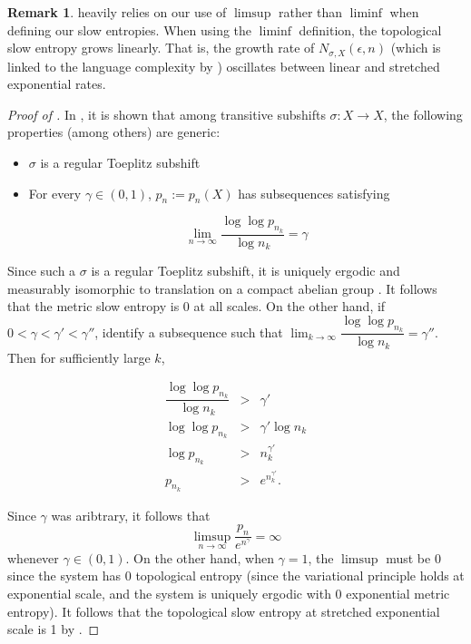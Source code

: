 \documentclass[oneside]{amsart}
\theoremstyle{plain}
\theoremstyle{definition}
\newtheorem{RMK}[THM]{Remark}
\newcommand{\<}{\langle}
\renewcommand{\>}{\rangle}
\newcommand{\ve}{\epsilon}
\renewcommand{\|}{|\!|} %
\begin{document}
\begin{RMK}
     heavily relies on our use of $\limsup$ rather than $\liminf$ when defining our slow entropies. When using the $\liminf$ definition, the topological slow entropy grows linearly. That is, the growth rate of $N_{\sigma,X}(\ve,n)$ (which is linked to the language complexity by ) oscillates between linear and stretched exponential rates.
\end{RMK}

\begin{proof}[Proof of ]
    In \cite[Theorem 5.15, Proposition 5.23]{PavlovSchmieding}, it is shown that among transitive subshifts $\sigma : X \to X$, the following properties (among others) are generic:

    \begin{itemize}
        \item $\sigma$ is a regular Toeplitz subshift
        \item For every $\gamma \in (0,1)$, $p_n := p_n(X)$ has subsequences satisfying

        \[ \lim_{n \to \infty} \dfrac{\log\log p_{n_k}}{\log n_k} = \gamma\]
    \end{itemize}

    Since such a $\sigma$ is a regular Toeplitz subshift, it is uniquely ergodic and measurably isomorphic to translation on a compact abelian group \cite{JacobsKeane}. It follows that the metric slow entropy is 0 at all scales. On the other hand, if $0 < \gamma < \gamma' < \gamma''$, identify a subsequence such that $\lim_{k \to \infty} \dfrac{\log\log p_{n_k}}{\log n_k} = \gamma''$. Then for sufficiently large $k$,

    \begin{eqnarray*}
        \dfrac{\log \log p_{n_k}}{\log n_k} &>& \gamma' \\
        \log \log p_{n_k} & > & \gamma' \log n_k \\
        \log p_{n_k} & > &n_k^{\gamma'} \\
        p_{n_k} & > & e^{n_k^{\gamma'}}.
    \end{eqnarray*}

    Since $\gamma$ was aribtrary, it follows that 
    \[ \limsup_{n\to \infty} \dfrac{p_n}{e^{n^\gamma}} = \infty\]
    whenever $\gamma \in (0,1)$. On the other hand, when $\gamma = 1$, the $\limsup$ must be 0 since the system has 0 topological entropy (since the variational principle holds at exponential scale, and the system is uniquely ergodic with 0 exponential metric entropy). It follows that the topological slow entropy at stretched exponential scale is 1 by .
\end{proof}
\end{document}
